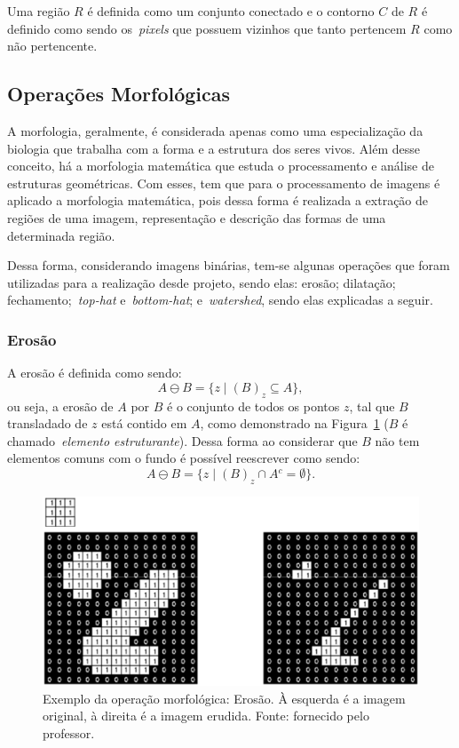 \documentclass[conference]{Trabalho_2}
\begin{document}
Uma regi\~ao $R$ \'e definida como um conjunto conectado e o contorno $C$ de $R$ \'e definido como sendo os~\textit{pixels} que possuem vizinhos que tanto pertencem $R$ como n\~ao pertencente.

\subsection{Opera\c{c}\~oes Morfol\'ogicas}
A morfologia, geralmente, \'e considerada apenas como uma especializa\c{c}\~ao da biologia que trabalha com a forma e a estrutura dos seres vivos. Al\'em desse conceito, h\'a a morfologia matem\'atica que estuda o processamento e an\'alise de estruturas geom\'etricas. Com esses, tem que para o processamento de imagens \'e aplicado a morfologia matem\'atica, pois dessa forma \'e realizada a extra\c{c}\~ao de regi\~oes de uma imagem, representa\c{c}\~ao e descri\c{c}\~ao das formas de uma determinada regi\~ao.

Dessa forma, considerando imagens bin\'arias, tem-se algunas opera\c{c}\~oes que foram utilizadas para a realiza\c{c}\~ao desde projeto, sendo elas: eros\~ao; dilata\c{c}\~ao; fechamento;~\textit{top-hat} e~\textit{bottom-hat}; e~\textit{watershed}, sendo elas explicadas a seguir.

\subsubsection{Eros\~ao}
A eros\~ao \'e definida como sendo:
$$ A \ominus B  = \{z \mid (B)_z \subseteq A\},$$
ou seja, a eros\~ao de $A$ por $B$ \'e o conjunto de todos os pontos $z$, tal que $B$ transladado de $z$ est\'a contido em $A$, como demonstrado na Figura~\ref{fig:erosao} ($B$ \'e chamado~\textit{elemento estruturante}). Dessa forma ao considerar que $B$ n\~ao tem elementos comuns com o fundo \'e poss\'ivel reescrever como sendo:
$$ A \ominus B  = \{z \mid (B)_z \cap A{^c} = \emptyset \}.$$

\begin{figure}[]
  \centering
  \includegraphics[width = 7.5 cm]{Erosao}
  \caption{Exemplo da opera\c{c}\~ao morfol\'ogica: Eros\~ao. \`A esquerda \'e a imagem original, \`a direita \'e a imagem erudida. Fonte: fornecido pelo professor.}
  \label{fig:erosao}
\end{figure}
\end{document}
